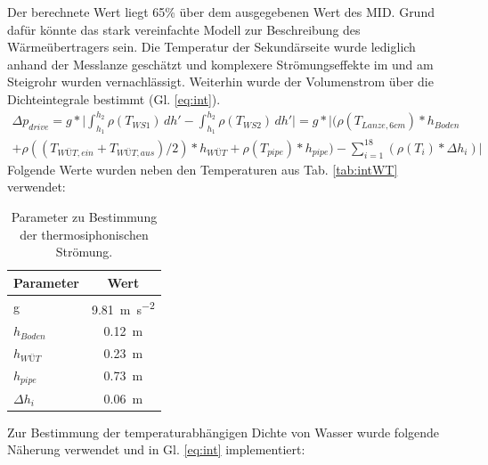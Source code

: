 Der berechnete Wert liegt 65\% über dem ausgegebenen Wert des MID. Grund dafür könnte das stark vereinfachte Modell zur Beschreibung des Wärmeübertragers sein. Die Temperatur der Sekundärseite wurde lediglich anhand der Messlanze geschätzt und komplexere Strömungseffekte im und am Steigrohr wurden vernachlässigt. Weiterhin wurde der Volumenstrom über die Dichteintegrale bestimmt (Gl. \ref{eq:int}).
\begin{multline}
	\label{eq:int}
	\Delta p_{drive}=g*\biggl|\int_{h_{1}}^{h_{2}}\rho(T_{WS1})\,dh'-\int_{h_{1}}^{h_{2}}\rho(T_{WS2})\,dh'\biggl|=g*\biggl|(\rho(T_{Lanze,6cm})*h_{Boden}\\+\rho((T_{WÜT,ein}+T_{WÜT,aus})/2)*h_{WÜT}+\rho(T_{pipe})*h_{pipe})-\sum\limits_{i=1}^{18}(\rho(T_{i})*\Delta h_{i})\biggl|
\end{multline}
Folgende Werte wurden neben den Temperaturen aus Tab. \ref{tab:intWT} verwendet:

\begin{table}[H]
	\centering
	
	\begin{tabular}{l|c}
		
		
		\textbf{Parameter} & \textbf{Wert}\\
		\hline
		g & \SI{9,81}{\meter\per\square\second}\\
		$h_{Boden}$ & \SI{0,12}{\meter}   \\
		$h_{WÜT}$ & \SI{0,23}{\meter}   \\
		$h_{pipe}$ & \SI{0,73}{\meter}   \\
		$\Delta h_{i}$ & \SI{0,06}{\meter}   \\
	\end{tabular}
\caption[Parameter zu Bestimmung der thermosiphonischen Strömung.]{Parameter zu Bestimmung der thermosiphonischen Strömung.}
\label{tab:par}
\end{table}
Zur Bestimmung der temperaturabhängigen Dichte von Wasser wurde folgende Näherung verwendet und in Gl. \ref{eq:int} implementiert:

